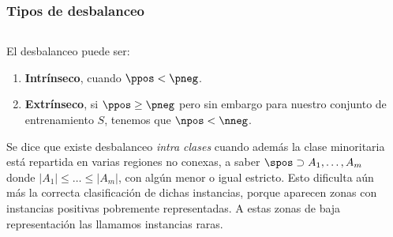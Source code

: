 \begin{frame}\frametitle{Tipos de desbalanceo}
\begin{columns} 
 \begin{column}{0.55\textwidth}
  El desbalanceo puede ser:
  
  \begin{enumerate}[i]
   \item \textbf{Intrínseco}, cuando $\ppos < \pneg$.

   \item \textbf{Extrínseco}, si $\ppos \ge \pneg$ pero sin embargo para nuestro conjunto de entrenamiento $S$, 
   tenemos que $\npos < \nneg$.
  \end{enumerate}
  
  \justifying
  Se dice que existe desbalanceo \textit{intra clases} cuando además la clase minoritaria está repartida en varias 
  regiones no conexas, a saber $\spos \supset A_1, \ldots, A_m$ donde $|A_1| \le \ldots \le |A_m|$, con algún menor o igual estricto.
  Esto dificulta aún más la correcta clasificación de dichas instancias, porque aparecen zonas con instancias positivas 
  pobremente representadas. A estas zonas de baja representación las llamamos instancias raras.
 \end{column}
 
 \begin{column}{0.45\textwidth}
 \end{column}
\end{columns}
\end{frame}

